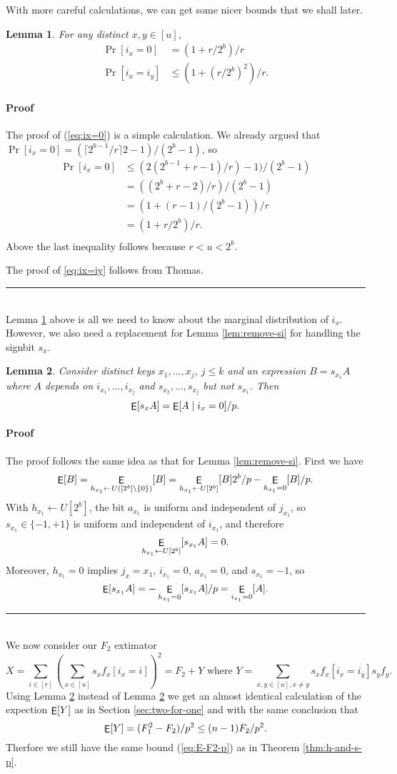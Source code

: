 \documentclass[12pt]{article}
\newcommand{\suchthat}{\mathrel{}\mathclose{}\ifnum\currentgrouptype=16\middle\fi\vert\mathopen{}\mathrel{}}
\DeclareMathOperator*{\E}{\sf{E}}
\newcommand{\req}[1]{(\ref{#1})}
\newtheorem {lemma} {Lemma}[section]
\newcommand{\qed}{\rule{1ex}{1ex}}
\newenvironment{proof}[1][]{\paragraph*{Proof{#1}}}{\hfill \qed\smallskip\\}
\newcommand\ceil[1]{\lceil {#1}\rceil}
\begin{document}
With
more careful calculations, we can get some nicer bounds
that we shall later.
\begin{lemma}\label{lem:ix-r-dist} For any distinct $x,y\in [u]$, 
\begin{align}
\Pr[i_x=0]&=(1+r/2^b)/r\label{eq:ix=0}\\
\Pr[i_x=i_y]&\leq \left(1+(r/2^b)^2\right)/r.\label{eq:ix=iy}
\end{align}
\end{lemma}
\begin{proof}
The proof of \req{eq:ix=0} is a simple calculation. We
already argued that $\Pr[i_x=0]=(\ceil{2^{b-1}/r}2-1)/(2^{b}-1)$, so
\begin{align*}
\Pr[i_x=0]&\leq (2(2^{b-1}+r-1)/r)-1)/(2^{b}-1)\\
&=((2^b+r-2)/r)/(2^b-1)\\
&=\left(1+(r-1)/(2^b-1)\right)/r\\
&=\left(1+r/2^b\right)/r.\\
\end{align*}
Above the last inequality follows because $r<u<2^b$.

The proof of \ref{eq:ix=iy} follows from {\color{red}Thomas}.
\end{proof}
Lemma \ref{lem:ix-r-dist} above is all we need to know about the
marginal distribution of $i_x$. However, we also need a replacement
for Lemma \ref{lem:remove-si} for handling the signbit $s_x$.
\begin{lemma}\label{lem:remove-si-r-dist} Consider distinct keys
$x_1,\ldots,x_j$, $j\leq k$ and an expression $B=s_{x_1}A$ where $A$
depends on $i_{x_1},\ldots,i_{x_j}$ and $s_{x_2},\ldots,s_{x_j}$ but not
$s_{x_1}$. 
Then
\begin{equation}\label{eq:remove-si-r-dist}
\E[s_xA]=\E[A\suchthat i_x=0]/p.
\end{equation}
\end{lemma}
\begin{proof}
The proof follows the same idea as that for Lemma \ref{lem:remove-si}.
First we have
\[\E[B]=\E_{h_{x_1}\gets U([2^b]\setminus\{0\})}[B]=\E_{h_{x_1}\gets U[2^b]}[B]2^b/p-\E_{h_{x_1}=0}[B]/p.\]
With $h_{x_1}\gets U[2^b]$, the bit $a_{x_1}$ is uniform and 
independent of $j_{x_1}$, so $s_{x_1}\in\{-1,+1\}$ is uniform and 
independent of $i_{x_1}$, and therefore 
\[\E_{h_{x_1}\gets U[2^b]}[s_{x_1}A]=0.\]
Moreover, $h_{x_1}=0$ implies $j_x={x_1}$, $i_{x_1}=0$, $a_{x_1}=0$,
and $s_{x_1}=-1$,
so 
\[\E[s_{x_1}A]=-\E_{h_{x_1}=0}[s_{x_1}A]/p=\E_{i_{x_1}=0}[A].\]
\end{proof}
We now consider our $F_2$ extimator
\[X=\sum_{i\in[r]}\left( \sum_{x\in[u]}s_x f_x[i_x=i]\right)^2\!
=F_2+Y\mbox{ where }Y=\sum_{x,y\in[u],x\neq y}
s_x f_x[i_x=i_y]s_y f_y.\]
Using Lemma \ref{lem:remove-si-r-dist} instead of Lemma
\ref{lem:remove-si-r-dist} we get an almost identical calculation 
of the expection $\E[Y]$ as
in Section \ref{sec:two-for-one} and with the same
conclusion that 
\begin{equation}\label{eq:E-Mersenne-arb-r}
\E[Y]=(F_1^2-F_2)/p^2\leq (n-1)F_2/p^2.
\end{equation}
Therfore we still have the same bound \req{eq:E-F2-p} as in Theorem \ref{thm:h-and-s-p}.
\end{document}
